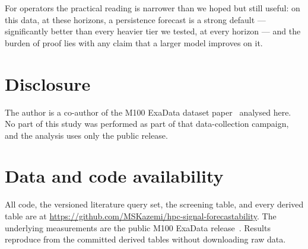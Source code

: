 \documentclass[11pt,a4paper]{article}
\begin{document}
For operators the practical reading is narrower than we hoped but still useful:
on this data, at these horizons, a persistence forecast is a strong default ---
significantly better than every heavier tier we tested, at every horizon --- and
the burden of proof lies with any claim that a larger model improves on it.

\section*{Disclosure}

The author is a co-author of the M100 ExaData dataset paper~\citep{borghesi2023m100}
analysed here. No part of this study was performed as part of that data-collection
campaign, and the analysis uses only the public release.

\section*{Data and code availability}

All code, the versioned literature query set, the screening table, and every
derived table are at
\url{https://github.com/MSKazemi/hpc-signal-forecastability}. The underlying
measurements are the public M100 ExaData release~\citep{borghesi2023m100}.
Results reproduce from the committed derived tables without downloading raw
data.



\end{document}
